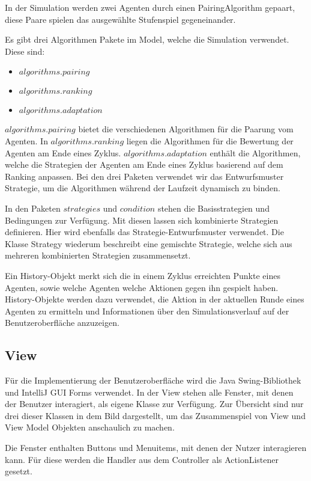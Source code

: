 In der Simulation werden zwei Agenten durch einen PairingAlgorithm gepaart, diese Paare spielen das ausgewählte Stufenspiel gegeneinander.

Es gibt drei Algorithmen Pakete im Model, welche die Simulation verwendet. Diese sind: 
\begin{itemize}
\item $algorithms.pairing$
\item $algorithms.ranking$
\item $algorithms.adaptation$
\end{itemize}
$algorithms.pairing$ bietet die verschiedenen Algorithmen für die Paarung vom Agenten. In $algorithms.ranking$ liegen die Algorithmen für die Bewertung der Agenten am Ende eines Zyklus. $algorithms.adaptation$ enthält die Algorithmen, welche die Strategien der Agenten am Ende eines Zyklus basierend auf dem Ranking anpassen. Bei den drei Paketen verwendet wir das Entwurfsmuster Strategie, um die Algorithmen während der Laufzeit dynamisch zu binden.

In den Paketen $strategies$ und $condition$ stehen die Basisstrategien und Bedingungen zur Verfügung. Mit diesen lassen sich kombinierte Strategien definieren. Hier wird ebenfalls das Strategie-Entwurfsmuster verwendet. Die Klasse Strategy wiederum beschreibt eine gemischte Strategie, welche sich aus mehreren kombinierten Strategien zusammensetzt.

Ein History-Objekt merkt sich die in einem Zyklus erreichten Punkte eines Agenten, sowie welche Agenten welche Aktionen gegen ihn gespielt haben. History-Objekte werden dazu verwendet, die Aktion in der aktuellen Runde eines Agenten zu ermitteln und Informationen über den Simulationsverlauf auf der Benutzeroberfläche anzuzeigen.


\subsection{View}

\noindent
{}

Für die Implementierung der Benutzeroberfläche wird die Java Swing-Bibliothek und IntelliJ GUI Forms verwendet. In der View stehen alle Fenster, mit denen der Benutzer interagiert, als eigene Klasse zur Verfügung. Zur Übersicht sind nur drei dieser Klassen in dem Bild dargestellt, um das Zusammenspiel von View und View Model Objekten anschaulich zu machen.

Die Fenster enthalten Buttons und Menuitems, mit denen der Nutzer interagieren kann. Für diese werden die Handler aus dem Controller als ActionListener gesetzt.

